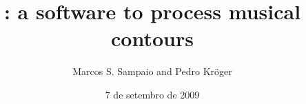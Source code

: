 \documentclass{beamer}
\title{\goiaba{}: a software to process musical contours}
\author{Marcos S. Sampaio and Pedro Kröger}
\date{7 de setembro de 2009}
\begin{document}
\frame{\titlepage}

\section{}

\frame{
  \frametitle{}
}
\end{document}
